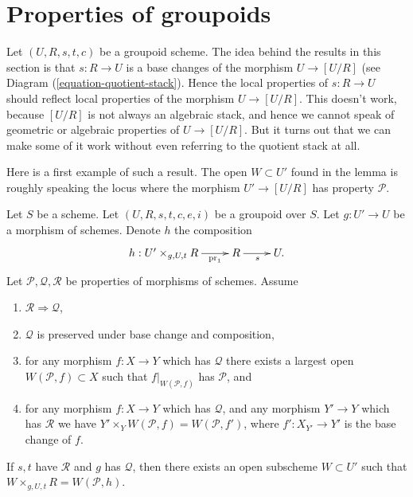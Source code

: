 \section{Properties of groupoids}
\label{section-technical-lemma}

\noindent
Let $(U, R, s, t, c)$ be a groupoid scheme.
The idea behind the results in this section is that $s: R \to U$
is a base changes of the morphism $U \to [U/R]$ (see
Diagram (\ref{equation-quotient-stack}).
Hence the local properties of $s : R \to U$ should reflect local
properties of the morphism $U \to [U/R]$.
This doesn't work, because $[U/R]$ is not always an algebraic stack, and
hence we cannot speak of geometric or algebraic properties of
$U \to [U/R]$.
But it turns out that we can make some of it work without even
referring to the quotient stack at all.

\medskip\noindent
Here is a first example of such a result. The open $W \subset U'$ found
in the lemma is roughly speaking the locus where the morphism
$U' \to [U/R]$ has property $\mathcal{P}$.

\begin{lemma}
\label{lemma-local-source}
Let $S$ be a scheme.
Let $(U, R, s, t, c, e, i)$ be a groupoid over $S$.
Let $g : U' \to U$ be a morphism of schemes.
Denote $h$ the composition
$$
\xymatrix{
h : U' \times_{g, U, t} R \ar[r]_-{\text{pr}_1} & R \ar[r]_s & U.
}
$$
Let $\mathcal{P}, \mathcal{Q}, \mathcal{R}$ be properties of morphisms
of schemes. Assume
\begin{enumerate}
\item $\mathcal{R} \Rightarrow \mathcal{Q}$,
\item $\mathcal{Q}$ is preserved under base change and composition,
\item for any morphism $f : X \to Y$ which has $\mathcal{Q}$ there exists a
largest open $W(\mathcal{P}, f) \subset X$ such that $f|_{W(\mathcal{P}, f)}$
has $\mathcal{P}$, and
\item for any morphism $f : X \to Y$ which has $\mathcal{Q}$,
and any morphism $Y' \to Y$ which has $\mathcal{R}$ we have
$Y' \times_Y W(\mathcal{P}, f) = W(\mathcal{P}, f')$, where
$f' : X_{Y'} \to Y'$ is the base change of $f$.
\end{enumerate}
If $s,t$ have $\mathcal{R}$ and $g$ has $\mathcal{Q}$, then
there exists an open subscheme $W \subset U'$ such that
$W \times_{g, U, t} R = W(\mathcal{P}, h)$.
\end{lemma}

